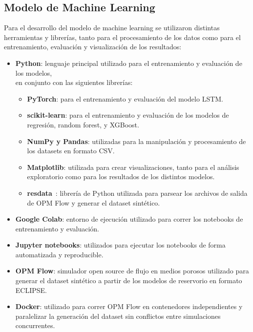 \documentclass[12pt,a4paper]{article}
\begin{document}
\subsection*{Modelo de Machine Learning}

Para el desarrollo del modelo de machine learning se utilizaron distintas herramientas y librerías,
tanto para el procesamiento de los datos como para el entrenamiento, evaluación y visualización
de los resultados:

\begin{itemize}
\item \textbf{Python}: lenguaje principal utilizado para el entrenamiento y evaluación de los modelos, \\
  en conjunto con las siguientes librerías:
  \begin{itemize}
    \item \textbf{PyTorch}: para el entrenamiento y evaluación del modelo LSTM.
    
    \item \textbf{scikit-learn}: para el entrenamiento y evaluación de los modelos de \\
    regresión, random forest, y XGBoost.
    
    \item \textbf{NumPy y Pandas}: utilizadas para la manipulación y procesamiento de los
    datasets en formato CSV.
    
    \item \textbf{Matplotlib}: utilizada para crear visualizaciones, tanto para el análisis exploratorio
    como para los resultados de los distintos modelos.

    \item \textbf{resdata}~\cite{resdata}: librería de Python utilizada para parsear los archivos de salida
    de OPM Flow y generar el dataset sintético.
  \end{itemize}

\item \textbf{Google Colab}: entorno de ejecución utilizado para correr los notebooks de
entrenamiento y evaluación.

\item \textbf{Jupyter notebooks}: utilizados para ejecutar los notebooks de
forma automatizada y reproducible.

\item \textbf{OPM Flow}: simulador open source de flujo en medios porosos utilizado para
generar el dataset sintético a partir de los modelos de reservorio en formato ECLIPSE.

\item \textbf{Docker}: utilizado para correr OPM Flow en contenedores independientes y
paralelizar la generación del dataset sin conflictos entre simulaciones concurrentes.
\end{itemize}
\end{document}
